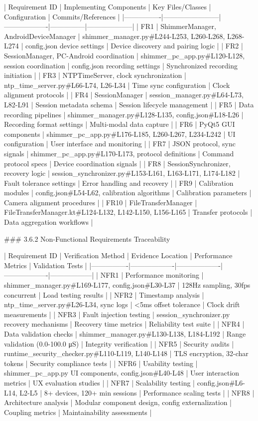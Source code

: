 \documentclass[12pt,a4paper]{article}
\begin{document}
| Requirement ID | Implementing Components | Key Files/Classes | Configuration | Commits/References |
|----------------|------------------------|-------------------|---------------|--------------------|
| FR1 | ShimmerManager, AndroidDeviceManager | shimmer_manager.py#L244-L253, L260-L268, L268-L274 | config.json device settings | Device discovery and pairing logic |
| FR2 | SessionManager, PC-Android coordination | shimmer_pc_app.py#L120-L128, session coordination | config.json recording settings | Synchronized recording initiation |
| FR3 | NTPTimeServer, clock synchronization | ntp_time_server.py#L66-L74, L26-L34 | Time sync configuration | Clock alignment protocols |
| FR4 | SessionManager | session_manager.py#L64-L73, L82-L91 | Session metadata schema | Session lifecycle management |
| FR5 | Data recording pipelines | shimmer_manager.py#L128-L135, config.json#L18-L26 | Recording format settings | Multi-modal data capture |
| FR6 | PyQt5 GUI components | shimmer_pc_app.py#L176-L185, L260-L267, L234-L242 | UI configuration | User interface and monitoring |
| FR7 | JSON protocol, sync signals | shimmer_pc_app.py#L170-L173, protocol definitions | Command protocol specs | Device coordination signals |
| FR8 | SessionSynchronizer, recovery logic | session_synchronizer.py#L153-L161, L163-L171, L174-L182 | Fault tolerance settings | Error handling and recovery |
| FR9 | Calibration modules | config.json#L54-L62, calibration algorithms | Calibration parameters | Camera alignment procedures |
| FR10 | FileTransferManager | FileTransferManager.kt#L124-L132, L142-L150, L156-L165 | Transfer protocols | Data aggregation workflows |

### 3.6.2 Non-Functional Requirements Traceability

| Requirement ID | Verification Method | Evidence Location | Performance Metrics | Validation Tests |
|----------------|-------------------|-------------------|-------------------|------------------|
| NFR1 | Performance monitoring | shimmer_manager.py#L169-L177, config.json#L30-L37 | 128Hz sampling, 30fps concurrent | Load testing results |
| NFR2 | Timestamp analysis | ntp_time_server.py#L26-L34, sync logs | <5ms offset tolerance | Clock drift measurements |
| NFR3 | Fault injection testing | session_synchronizer.py recovery mechanisms | Recovery time metrics | Reliability test suite |
| NFR4 | Data validation checks | shimmer_manager.py#L130-L138, L184-L192 | Range validation (0.0-100.0 μS) | Integrity verification |
| NFR5 | Security audits | runtime_security_checker.py#L110-L119, L140-L148 | TLS encryption, 32-char tokens | Security compliance tests |
| NFR6 | Usability testing | shimmer_pc_app.py UI components, config.json#L40-L48 | User interaction metrics | UX evaluation studies |
| NFR7 | Scalability testing | config.json#L6-L14, L2-L5 | 8+ devices, 120+ min sessions | Performance scaling tests |
| NFR8 | Architecture analysis | Modular component design, config externalization | Coupling metrics | Maintainability assessments |
\end{document}
